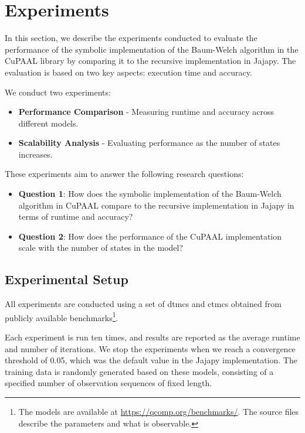\section{Experiments}
In this section, we describe the experiments conducted to evaluate the performance of the symbolic implementation of the Baum-Welch algorithm in the CuPAAL library by comparing it to the recursive implementation in Jajapy. The evaluation is based on two key aspects: execution time and accuracy.

We conduct two experiments:
\begin{itemize}
    \item \textbf{Performance Comparison} - Measuring runtime and accuracy across different models.
    \item \textbf{Scalability Analysis} - Evaluating performance as the number of states increases.
\end{itemize}

These experiments aim to answer the following research questions:
\begin{itemize}
    \item \textbf{Question 1}: How does the symbolic implementation of the Baum-Welch algorithm in CuPAAL compare to the recursive implementation in Jajapy in terms of runtime and accuracy?
    \item \textbf{Question 2}: How does the performance of the CuPAAL implementation scale with the number of states in the model?
\end{itemize}

\subsection{Experimental Setup}
All experiments are conducted using a set of \glspl{dtmc} and \glspl{ctmc} obtained from publicly available benchmarks\footnote{The models are available at \url{https://qcomp.org/benchmarks/}. The source files describe the parameters and what is observable.}.


Each experiment is run ten times, and results are reported as the average runtime and number of iterations.
We stop the experiments when we reach a convergence threshold of 0.05, which was the default value in the Jajapy implementation.
The training data is randomly generated based on these models, consisting of a specified number of observation sequences of fixed length.

